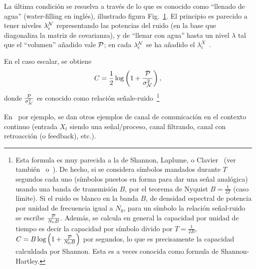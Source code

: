 La  \'ultima condici\'on  se resuelva  a  trav\'es de  lo que  es conocido  como
``llenado   de   agua''   (water-filling   en   ingl\'es),   illustrado   figura
Fig.~\ref{Fig:SZ:WaterFilling}.   El  principio  es  parecido  a  tener  niveles
$\lambda^\N_i$  representando  las  potencias  del  ruido (en  la  base  que
diagonaliza la  matriz de covarianza), y  de ``llenar con agua''  hasta un nivel
$\lambda$ tal que el ``volumen''  a\~nadido vale $\P$; en cada $\lambda^\N_i$
se ha a\~nadido el $\lambda^X_i$~\cite[Sec.~9.4]{CovTho06}.

\begin{figure}[h!]
%
\begin{center}  \end{center}
%
%
\label{Fig:SZ:WaterFilling}
\end{figure}

En   el   caso   escalar,   se   obtiene
%
\[
C = \frac12 \log\left( 1 + \frac{\P}{\sigma_\N^2} \right),
\]
%
donde     $\frac{\P}{\sigma_\N^2}$     es     conocido    como     relaci\'on
se\~nale-ruido~\footnote{Esta formula es muy  parecida a la de Shannon, Laplume,
  o Clavier~\cite{Sha48,  Lap48, Cla48} (ver tambi\'en~\cite[Sec.~9.3]{CovTho06}
  o~\cite[Sec.~11.2]{Rio07}).   De hecho,  si se  considera  s\'imbolos mandados
  durante  $T$ segundos  cada  uno (s\'imbolos  puestos  en forma  para dar  una
  se\~nal anal\'ogica) usando una banda  de transmisi\'on $B$, por el teorema de
  Nyquist $B = \frac{1}{2 T}$ (caso l\'imite). Si el ruido es blanco en la banda
  $B$, de densidad espectral de potencia por unidad de frecuencia igual a $N_0$,
  para  un  s\'imbolo  la  relaci\'on  se\~nal-ruido  se  escribe  $\frac{\P}{N_0
    B}$. Adem\'as,  se calcula en general  la capacidad por unidad  de tiempo es
  decir la capacidad  por s\'imbolo divido por  $T = \frac{1}{2 B}$, \ie  $C = B
  \log\left( 1 +  \frac{\P}{N_0 B} \right)$ por segundos,  lo que es precisamente
  la capacidad calculdada por Shannon.  Esta es a veces conocida como formula de
  Shannon-Hartley.}

En~\cite{CovTho06,  Rio07}  por ejemplo,  se  dan  otros  ejemplos de  canal  de
comunicaci\'on   en   el   contexto   continuo   (entrada   $X_t$   siendo   una
se\~nal/proceso, canal filtrando, canal con retroacci\'on (o feedback), etc.).

